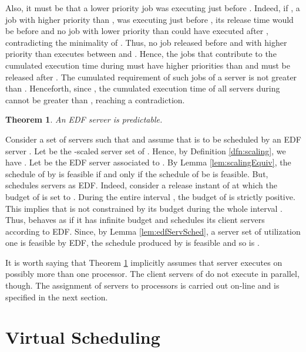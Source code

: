 \documentclass[twocolumn, compsocconf]{IEEEtran}
\newtheorem{theorem}{Theorem}[section]
\newcounter{proc}
\begin{document}
\begin{IEEEproof}
  Also, it must be that a lower priority job was executing just before .
  Indeed, if , a job with higher priority than , was executing just
  before , its release time  would be before  and no job with
  lower priority than  could have executed after , contradicting the
  minimality of . Thus, no job released before  and with higher
  priority than  executes between  and .  Hence, the jobs that
  contribute to the cumulated execution time during  must have higher
  priorities than  and must be released after . The cumulated
  requirement of such jobs of a server  is not greater than . Henceforth, since , the cumulated execution time of all servers during  cannot
  be greater than , reaching a contradiction.
\end{IEEEproof}

\begin{theorem}\label{thm:edfServPredict}
  An EDF server is predictable.
\end{theorem}

\begin{IEEEproof}
  Consider a set of servers  such that
   and assume that  is to be scheduled by an
  EDF server . Let  be the -scaled server set
  of . Hence, by Definition \ref{dfn:scaling}, we have
  . Let 
  be the EDF server associated to .  By Lemma \ref{lem:scalingEquiv},
  the schedule  of  by  is feasible if and only if the
  schedule  of  be  is feasible.  But,  schedules
  servers as EDF. Indeed, consider a release instant  of  at which the
  budget of  is set to . During the entire interval
  , the budget of  is strictly positive. This implies
  that  is not constrained by its budget during the whole interval . Thus,  behaves as if it has infinite budget and
  schedules its client servers according to EDF. Since, by Lemma
  \ref{lem:edfServSched}, a server set of utilization one is feasible by EDF,
  the schedule  produced by  is feasible and so is .
\end{IEEEproof}

It is worth saying that Theorem \ref{thm:edfServPredict} implicitly assumes that
server  executes on possibly more than one processor. The client servers of
 do not execute in parallel, though. The assignment of servers to processors
is carried out on-line and is specified in the next section.







\section{Virtual Scheduling}\label{sec:virtualSched}
\end{document}
